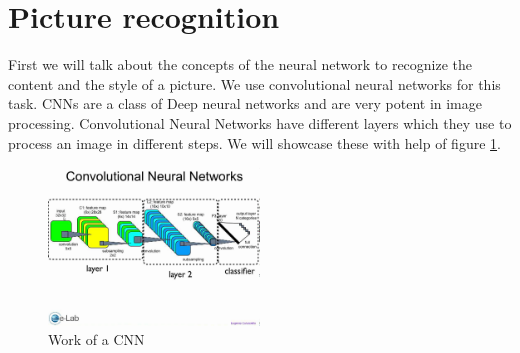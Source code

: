 \documentclass[acmtog, authorversion]{acmart}
\begin{document}
\section{Picture recognition}
First we will talk about the concepts of the neural network to recognize the content and the style of a picture. We use convolutional neural networks for this task. CNNs are a class of Deep neural networks and are very potent in image processing. \cite{Paper1} Convolutional Neural Networks have different layers which they use to process an image in different steps. We will showcase these with help of figure \ref{fig:Convolution}. 
\begin{figure}
\centering
	\includegraphics[width=0.5\textwidth]{figures/convolution.jpg}
	\caption{Work of a CNN \citep{convo}}
	\label{fig:Convolution}
\end{figure} 
\end{document}
